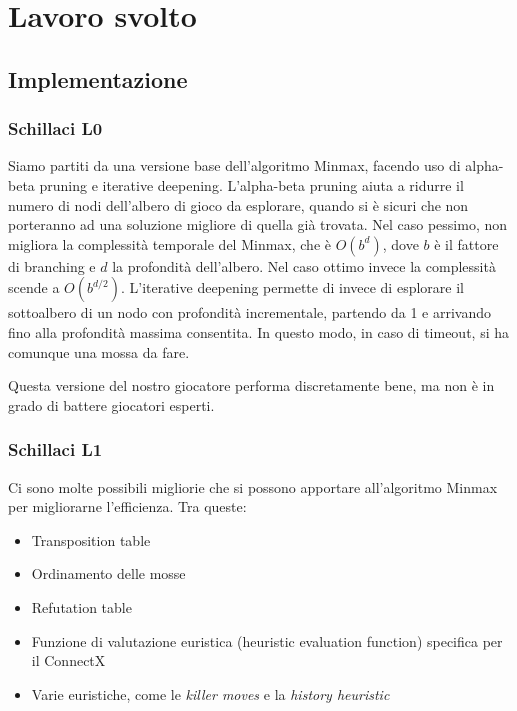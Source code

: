 \chapter{Lavoro svolto}

\section{Implementazione}

\subsection{Schillaci L0} \label{Schillaci L0}

Siamo partiti da una versione base dell'algoritmo Minmax, facendo uso di alpha-beta pruning e iterative deepening.
L'alpha-beta pruning aiuta a ridurre il numero di nodi dell'albero di gioco da esplorare, quando si è sicuri che non porteranno ad una soluzione migliore di quella già trovata.
Nel caso pessimo, non migliora la complessità temporale del Minmax, che è $O(b^d)$, dove $b$ è il fattore di branching e $d$ la profondità dell'albero. Nel caso ottimo invece la complessità scende a $O(b^{d/2})$.
L'iterative deepening permette di invece di esplorare il sottoalbero di un nodo con profondità incrementale, partendo da 1 e arrivando fino alla profondità massima consentita. In questo modo, in caso di timeout, si ha comunque una mossa da fare.

Questa versione del nostro giocatore performa discretamente bene, ma non è in grado di battere giocatori esperti.

\subsection{Schillaci L1}

Ci sono molte possibili migliorie che si possono apportare all'algoritmo Minmax per migliorarne l'efficienza.
Tra queste:
\begin{itemize}
    \item Transposition table
    \item Ordinamento delle mosse
    \item Refutation table
    \item Funzione di valutazione euristica (heuristic evaluation function) specifica per il ConnectX
    \item Varie euristiche, come le \textit{killer moves} e la \textit{history heuristic}
\end{itemize}


